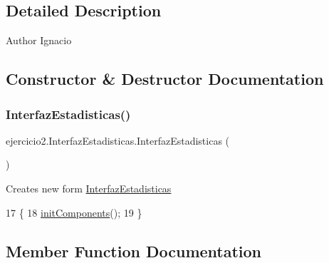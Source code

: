 \subsection{Detailed Description}
\begin{DoxyAuthor}{Author}
Ignacio 
\end{DoxyAuthor}


\subsection{Constructor \& Destructor Documentation}
\mbox{\label{classejercicio2_1_1_interfaz_estadisticas_a5d6221be6e64b17456cb3530ba3f7368}} 
\subsubsection{\texorpdfstring{Interfaz\+Estadisticas()}{InterfazEstadisticas()}}
{\footnotesize\ttfamily ejercicio2.\+Interfaz\+Estadisticas.\+Interfaz\+Estadisticas (\begin{DoxyParamCaption}{ }\end{DoxyParamCaption})\hspace{0.3cm}{\ttfamily [inline]}}

Creates new form \mbox{\hyperlink{classejercicio2_1_1_interfaz_estadisticas}{Interfaz\+Estadisticas}} 
\begin{DoxyCode}
17                                   \{
18         \mbox{\hyperlink{classejercicio2_1_1_interfaz_estadisticas_a1d07ba3d06b59fe5255f3ae1f5d44641}{initComponents}}();
19     \}
\end{DoxyCode}


\subsection{Member Function Documentation}
\mbox{\label{classejercicio2_1_1_interfaz_estadisticas_a1d07ba3d06b59fe5255f3ae1f5d44641}} 
